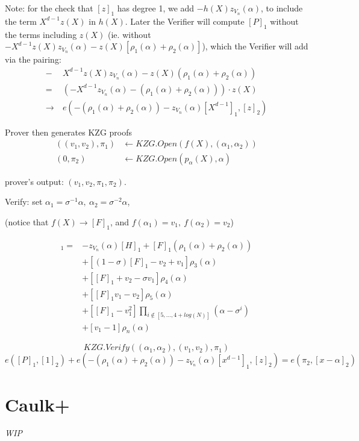 \documentclass{article}
\theoremstyle{definition}
\begin{document}
\begin{footnotesize}
	Note: for the check that $[z]_1$ has degree 1, we add $-h(X) z_{V_n}(\alpha)$, to include the term $X^{d-1} z(X)$ in $h(X)$. Later the Verifier will compute $[P]_1$ without the terms including $z(X)$ (ie. without $-X^{d-1} z(X)z_{V_n}(\alpha)-z(X)[\rho_1(\alpha)+\rho_2(\alpha)]$), which the Verifier will add via the pairing:
	\begin{align*}
		-&X^{d-1} z(X)z_{V_n}(\alpha)-z(X)(\rho_1(\alpha)+\rho_2(\alpha))\\
		=~ &(-X^{d-1} z_{V_n}(\alpha) - (\rho_1(\alpha)+\rho_2(\alpha))) \cdot z(X)\\
		\longrightarrow~ &e(- (\rho_1(\alpha)+\rho_2(\alpha)) - z_{V_n}(\alpha) [X^{d-1}]_1, [z]_2)
	\end{align*}
\end{footnotesize}


Prover then generates KZG proofs
\begin{align*}
	((v_1, v_2), \pi_1) &\leftarrow KZG.Open(f(X), (\alpha_1, \alpha_2))\\
	(0, \pi_2) &\leftarrow KZG.Open(p_{\alpha}(X), \alpha)
\end{align*}

prover's output: $(v_1, v_2, \pi_1, \pi_2)$.

Verify:
set $\alpha_1=\sigma^{-1}\alpha, ~\alpha_2=\sigma^{-2}\alpha$,

\begin{footnotesize}(notice that $f(X)\rightarrow [F]_1$, and $f(\alpha_1)=v_1,~f(\alpha_2)=v_2$)\end{footnotesize}

\begin{align*}
	[P]_1 = &-z_{V_n}(\alpha)[H]_1 + [F]_1 (\rho_1(\alpha) + \rho_2(\alpha))\\
		&+ [(1-\sigma) [F]_1 - v_2 + v_1] \rho_3(\alpha)\\
		&+ [[F]_1 + v_2 - \sigma v_1] \rho_4(\alpha)\\
		&+ [[F]_1 v_1 - v_2] \rho_5(\alpha)\\
		&+ [[F]_1 - v_1^2] \prod_{i \notin [5, \ldots, 4+log(N)]} (\alpha - \sigma^i)\\
		&+ [v_1-1] \rho_n(\alpha)
\end{align*}

$$KZG.Verify((\alpha_1, \alpha_2), (v_1, v_2), \pi_1)$$
$$e([P]_1, [1]_2) + e(-(\rho_1(\alpha) + \rho_2(\alpha)) - z_{V_n}(\alpha) [x^{d-1}]_1, [z]_2) = e(\pi_2, [x-\alpha]_2)$$


\section{Caulk+}
\emph{WIP}



\end{document}
